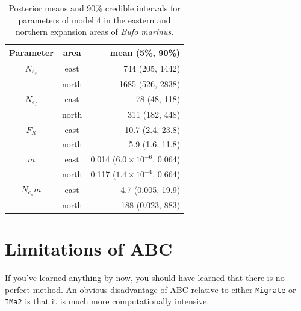 \documentclass[12pt]{article}
\begin{document}
\begin{table}
\begin{center}
\begin{tabular}{ccr}
\hline\hline
Parameter & area & mean (5\%, 90\%) \\
\hline
$N_{e_s}$ & east & 744 (205, 1442) \\
         & north & 1685 (526, 2838) \\
$N_{e_f}$ & east & 78 (48, 118) \\
         & north & 311 (182, 448) \\
$F_R$    & east & 10.7 (2.4, 23.8) \\
         & north & 5.9 (1.6, 11.8) \\
$m$      & east & 0.014 ($6.0 \times 10^{-6}$, 0.064) \\
         & north & 0.117 ($1.4 \times 10^{-4}$, 0.664) \\
$N_{e_s}m$ & east & 4.7 (0.005, 19.9) \\
          & north & 188 (0.023, 883) \\
\hline
\end{tabular}
\end{center}
\caption{Posterior means and 90\% credible intervals for parameters of
  model 4 in the eastern and northern expansion areas of {\it Bufo
    marinus}.}\label{table:cane-toad}
\end{table}

\section*{Limitations of ABC}

If you've learned anything by now, you should have learned that there
is no perfect method. An obvious disadvantage of ABC relative to
either {\tt Migrate} or {\tt IMa2} is that it is much more
computationally intensive. 
\end{document}
